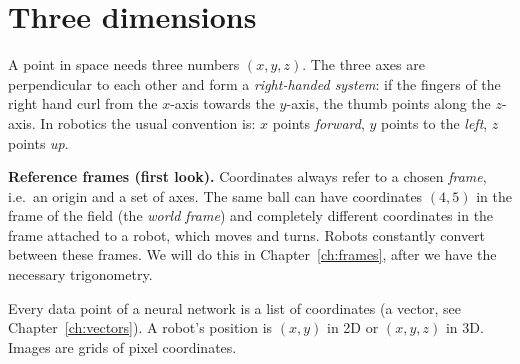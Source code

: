 \section*{Three dimensions}
A point in space needs three numbers $(x,y,z)$. The three axes are perpendicular to each other and form a \emph{right-handed system}: if the fingers of the right hand curl from the $x$-axis towards the $y$-axis, the thumb points along the $z$-axis. In robotics the usual convention is: $x$ points \emph{forward}, $y$ points to the \emph{left}, $z$ points \emph{up}.

\begin{center}

\label{fig:b2_2}
\end{center}

\textbf{Reference frames (first look).} Coordinates always refer to a chosen \emph{frame}, i.e.\ an origin and a set of axes. The same ball can have coordinates $(4,5)$ in the frame of the field (the \emph{world frame}) and completely different coordinates in the frame attached to a robot, which moves and turns. Robots constantly convert between these frames. We will do this in Chapter~\ref{ch:frames}, after we have the necessary trigonometry.

\begin{aibox}
Every data point of a neural network is a list of coordinates (a vector, see Chapter~\ref{ch:vectors}). A robot's position is $(x,y)$ in 2D or $(x,y,z)$ in 3D. Images are grids of pixel coordinates.
\end{aibox}

